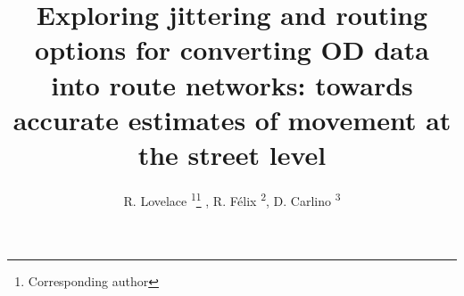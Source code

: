\documentclass{isprs} %
\begin{document}
\title{Exploring jittering and routing options for converting OD data into route networks: towards accurate estimates of movement at the street level}
\date{}


\author{
R. Lovelace \textsuperscript{1}\thanks{Corresponding author}
, R. Félix \textsuperscript{2}, 
D. Carlino \textsuperscript{3}
}

\address{
\textsuperscript{1} Institute for Transport Studies, University of Leeds, UK - r.lovelace@leeds.ac.uk \\
\textsuperscript{2} CERIS, Instituto Superior Técnico, University of Lisbon, Portugal - rosamfelix@tecnico.ulisboa.pt \\
\textsuperscript{3} Alan Turing Institute, UK - dcarlino@turing.ac.uk
}



\icwg{}   %
\end{document}
